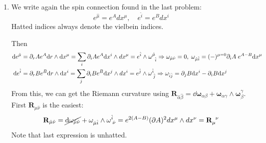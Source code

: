 \documentclass[11pt, class=article, crop=false]{standalone}
\begin{document}
\begin{enumerate}
	Meanwhile in the \emph{transverse} directions we no longer expect $\d_i \epsilon = 0$. It is important to note that the components of the spin connection $\omega_{i}^{\; ab} \Gamma_{ab}$ will only be nonvanishing for $a, b = \{j, k\}$ being transverse coordinates, in which case $\Gamma_{jk}$ is proportional to the infinitesimal rotation generator. By assumption of spherical symmetry (just as in the RN case of problem \textbf{35}), this must vanish $\Gamma_{jk} \epsilon = 0$. 
	\[
	\begin{aligned}
		0 &= \d_r \epsilon + \cancel{\frac14 \omega_r^{ab} \Gamma_{ab} \epsilon} \pm \frac{e^{A(p-3)}}{8} 4 A' e^{4A} \Gamma^{r 0 \dots p} \Gamma_r \mathcal P_{p+2} \epsilon\\
		&=  \d_r \epsilon \pm  \frac12 A' \, \Gamma^{\hat r\hat 0 \dots \hat p} \Gamma_r \mathcal P_{p+2} \epsilon \\
		&= \d_r \epsilon \pm  (-1)^{p+1} \frac12 A' \, \Gamma^{\hat 0 \dots \hat p} \mathcal P_{p+2} \epsilon\\
		&= \d_r \epsilon - \frac12 A' \epsilon \Rightarrow \epsilon = e^{A/2} \epsilon_0
	\end{aligned}
	\]
	where $\epsilon_0$ is a constant spinor satisfying the linear algebraic constraints previously given.
	
	We thus have that indeed our configuration is half-BPS.

	\item We write again the spin connection found in the last problem:
	\[
		e^{\hat \mu} = e^A dx^\mu, \quad e^{\hat i} = e^B dx^{i}
	\]
	Hatted indices always denote the vielbein indices.
	
	Then
	\[
		\begin{aligned}
			\mathrm{d} e^{\hat \mu} &= \partial_r A e^{A} \mathrm{d} r \wedge \mathrm{d} x^\mu = \sum_i \partial_i A e^A \mathrm{d} x^i \wedge dx^\mu = e^{\hat i} \wedge \omega^{\hat \mu}_{\;\; \hat i} \Rightarrow  \omega_{\hat \mu \hat \nu} = 0, \; \omega_{\hat \mu \hat i} = (-)^{\mu=0} \partial_i A \; e^{A - B} \mathrm{d} x^\mu \\
			\mathrm{d} e^{\hat i} &= \partial_r B e^{B} \mathrm{d} r \wedge \mathrm{d} x^i = \sum_j \partial_i B e^B \mathrm{d} x^j \wedge dx^i = e^{\hat j} \wedge \omega^{\hat i}_{\; \hat j}
			\Rightarrow \omega_{\hat i \hat j} = \partial_j B \mathrm{d} x^i - \partial_i B \mathrm{d} x^j \\
		\end{aligned}
	\]
	From this, we can get the Riemann curvature using $\mathbf{R}_{\hat \alpha \hat \beta} = \dd \boldsymbol{\omega}_{\alpha \beta} + \boldsymbol{\omega}_{\alpha \gamma} \wedge \boldsymbol{\omega}^\gamma_\beta$. First $\mathbf{R}_{\hat \mu \hat \nu}$ is the easiest:
	\[
		\mathbf{R}_{\hat \mu \hat \nu} = \cancel{\mathrm{d} \omega_{\hat \mu \hat \nu}} + \omega_{\hat \mu \hat i} \wedge \omega^{\hat i}_{\; \hat \nu} = e^{2(A-B)} (\partial A)^2 dx^\mu \wedge dx^\nu = \mathbf{R}_{\mu}^{\;\; \nu}
	\]
	Note that last expression is unhatted. 
	

\end{enumerate}
\end{document}
